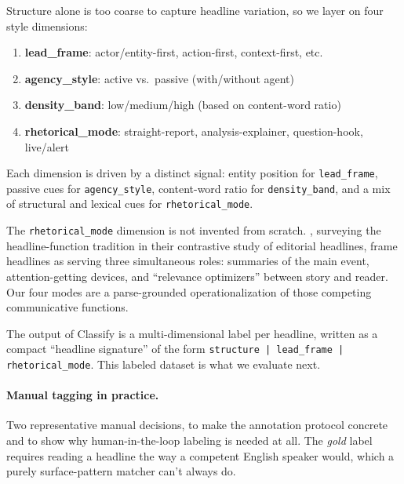 \documentclass[11pt]{article}
\begin{document}
Structure alone is too coarse to capture headline variation, so we layer on four style dimensions:

\begin{enumerate}
    \item \textbf{lead\_frame}: actor/entity-first, action-first, context-first, etc.
    \item \textbf{agency\_style}: active vs.\ passive (with/without agent)
    \item \textbf{density\_band}: low/medium/high (based on content-word ratio)
    \item \textbf{rhetorical\_mode}: straight-report, analysis-explainer, question-hook, live/alert
\end{enumerate}

Each dimension is driven by a distinct signal: entity position for \texttt{lead\_frame}, passive cues for \texttt{agency\_style}, content-word ratio for \texttt{density\_band}, and a mix of structural and lexical cues for \texttt{rhetorical\_mode}.

The \texttt{rhetorical\_mode} dimension is not invented from scratch. \citet{bonyadi-samuel-2013-headlines}, surveying the headline-function tradition in their contrastive study of editorial headlines, frame headlines as serving three simultaneous roles: summaries of the main event, attention-getting devices, and ``relevance optimizers'' between story and reader. Our four modes are a parse-grounded operationalization of those competing communicative functions.

The output of Classify is a multi-dimensional label per headline, written as a compact ``headline signature'' of the form \texttt{structure | lead\_frame | rhetorical\_mode}. This labeled dataset is what we evaluate next.

\paragraph{Manual tagging in practice.} Two representative manual decisions, to make the annotation protocol concrete and to show why human-in-the-loop labeling is needed at all. The \emph{gold} label requires reading a headline the way a competent English speaker would, which a purely surface-pattern matcher can't always do.
\end{document}
